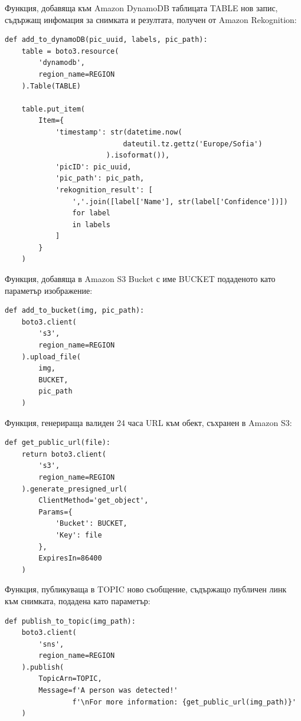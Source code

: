 \documentclass[12pt]{article}
\begin{document}
Функция, добавяща към Amazon DynamoDB таблицата TABLE нов запис, съдържащ инфомация за снимката и резултата, получен от Amazon Rekognition:
\begin{verbatim}
def add_to_dynamoDB(pic_uuid, labels, pic_path):
    table = boto3.resource(
        'dynamodb',
        region_name=REGION
    ).Table(TABLE)

    table.put_item(
        Item={
            'timestamp': str(datetime.now(
                            dateutil.tz.gettz('Europe/Sofia')
                        ).isoformat()),
            'picID': pic_uuid,
            'pic_path': pic_path,
            'rekognition_result': [
                ','.join([label['Name'], str(label['Confidence'])])
                for label
                in labels
            ]
        }
    )
\end{verbatim}

Функция, добавяща в Amazon S3 Bucket с име BUCKET подаденото като параметър изображение:
\begin{verbatim}
def add_to_bucket(img, pic_path):
    boto3.client(
        's3',
        region_name=REGION
    ).upload_file(
        img,
        BUCKET,
        pic_path
    )
\end{verbatim}

Функция, генерираща валиден 24 часа URL към обект, съхранен в Amazon S3:
\begin{verbatim}
def get_public_url(file):
    return boto3.client(
        's3',
        region_name=REGION
    ).generate_presigned_url(
        ClientMethod='get_object',
        Params={
            'Bucket': BUCKET,
            'Key': file
        },
        ExpiresIn=86400
    )
\end{verbatim}

Функция, публикуваща в TOPIC ново съобщение, съдържащо публичен линк към снимката, подадена като параметър: 
\begin{verbatim}
def publish_to_topic(img_path):
    boto3.client(
        'sns',
        region_name=REGION
    ).publish(
        TopicArn=TOPIC,
        Message=f'A person was detected!'
                f'\nFor more information: {get_public_url(img_path)}'
    )
\end{verbatim}
\end{document}
